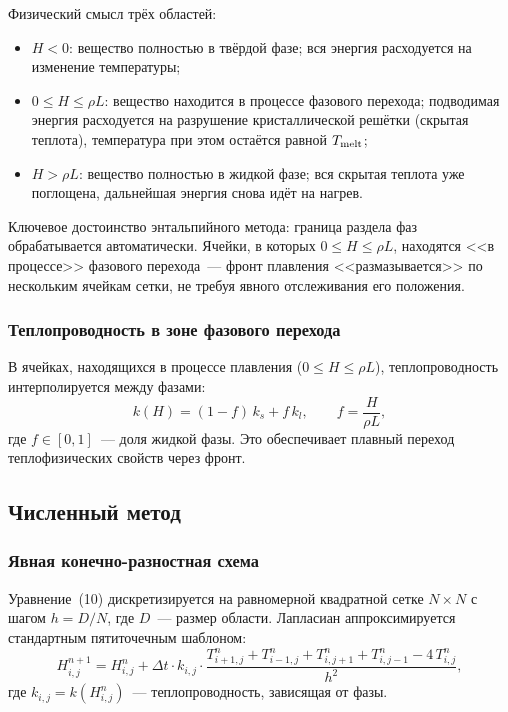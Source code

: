 Физический смысл трёх областей:
\begin{itemize}
  \item $H < 0$: вещество полностью в твёрдой фазе; вся энергия расходуется
        на изменение температуры;
  \item $0 \le H \le \rho L$: вещество находится в процессе фазового перехода;
        подводимая энергия расходуется на разрушение кристаллической решётки
        (скрытая теплота), температура при этом остаётся равной $T_{\rm melt}$;
  \item $H > \rho L$: вещество полностью в жидкой фазе; вся скрытая теплота
        уже поглощена, дальнейшая энергия снова идёт на нагрев.
\end{itemize}

Ключевое достоинство энтальпийного метода: граница раздела фаз
обрабатывается автоматически. Ячейки, в которых $0 \le H \le \rho L$,
находятся <<в процессе>> фазового перехода~--- фронт плавления
<<размазывается>> по нескольким ячейкам сетки, не требуя явного
отслеживания его положения.

\subsubsection{Теплопроводность в зоне фазового перехода}

В ячейках, находящихся в процессе плавления ($0 \le H \le \rho L$),
теплопроводность интерполируется между фазами:
\begin{equation}
  k(H) = (1 - f)\,k_s + f\,k_l, \qquad f = \frac{H}{\rho L},
\end{equation}
где $f \in [0,1]$~--- доля жидкой фазы. Это обеспечивает плавный
переход теплофизических свойств через фронт.

\subsection{Численный метод}

\subsubsection{Явная конечно-разностная схема}

Уравнение~(10) дискретизируется на равномерной
квадратной сетке $N \times N$ с шагом $h = D / N$, где $D$~--- размер
области. Лапласиан аппроксимируется стандартным пятиточечным шаблоном:
\begin{equation}\label{eq:scheme}
  H_{i,j}^{n+1} = H_{i,j}^{n}
    + \Delta t \cdot k_{i,j}
    \cdot \frac{T_{i+1,j}^n + T_{i-1,j}^n + T_{i,j+1}^n + T_{i,j-1}^n
          - 4\,T_{i,j}^n}{h^2},
\end{equation}
где $k_{i,j} = k(H_{i,j}^n)$~--- теплопроводность, зависящая от фазы.

